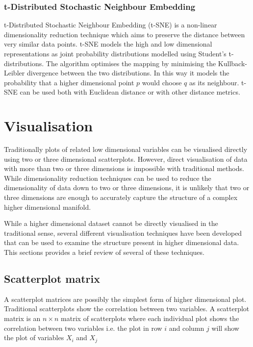 \subsubsection{t-Distributed Stochastic Neighbour Embedding}
t-Distributed Stochastic Neighbour Embedding (t-SNE) \cite{van2008visualizing} is a non-linear dimensionality reduction technique which aims to preserve the distance between very similar data points. t-SNE models the high and low dimensional representations as joint probability distributions modelled using Student's t-distributions. The algorithm optimises the mapping by minimising the Kullback-Leibler divergence between the two distributions. In this way it models the probability that a higher dimensional point $p$ would choose $q$ as its neighbour. t-SNE can be used both with Euclidean distance or with other distance metrics.

\section{Visualisation}
\label{sec:visualisation}
Traditionally plots of related low dimensional variables can be visualised directly using two or three dimensional scatterplots. However, direct visualisation of data with more than two or three dimensions is impossible with traditional methods. While dimensionality reduction techniques can be used to reduce the dimensionality of data down to two or three dimensions, it is unlikely that two or three dimensions are enough to accurately capture the structure of a complex higher dimensional manifold.

While a higher dimensional dataset cannot be directly visualised in the traditional sense, several different visualisation techniques have been developed that can be used to examine the structure present in higher dimensional data. This sections provides a brief review of several of these techniques.

\subsection{Scatterplot matrix}
A scatterplot matrices are possibly the simplest form of higher dimensional plot. Traditional scatterplots show the correlation between two variables. A scatterplot matrix is an $n \times n$ matrix of scatterplots where each individual plot shows the correlation between two variables i.e. the plot in row $i$ and column $j$ will show the plot of variables $X_i$ and $X_j$ 

